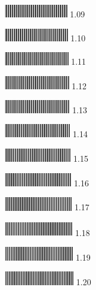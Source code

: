 \documentclass{article}
\begin{document}
\includegraphics[width=1.09in]{bw_interlaced_horizontal.png} 1.09

\includegraphics[width=1.10in]{bw_interlaced_horizontal.png} 1.10



\includegraphics[width=1.11in]{bw_interlaced_horizontal.png} 1.11

\includegraphics[width=1.12in]{bw_interlaced_horizontal.png} 1.12

\includegraphics[width=1.13in]{bw_interlaced_horizontal.png} 1.13

\includegraphics[width=1.14in]{bw_interlaced_horizontal.png} 1.14

\includegraphics[width=1.15in]{bw_interlaced_horizontal.png} 1.15

\includegraphics[width=1.16in]{bw_interlaced_horizontal.png} 1.16

\includegraphics[width=1.17in]{bw_interlaced_horizontal.png} 1.17

\includegraphics[width=1.18in]{bw_interlaced_horizontal.png} 1.18

\includegraphics[width=1.19in]{bw_interlaced_horizontal.png} 1.19

\includegraphics[width=1.20in]{bw_interlaced_horizontal.png} 1.20
\end{document}
